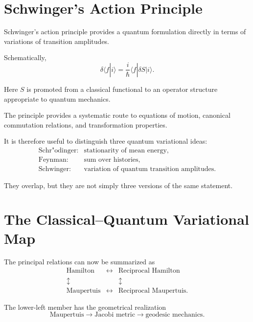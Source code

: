 \section{Schwinger's Action Principle}

Schwinger's action principle provides a quantum formulation directly in terms of variations of transition amplitudes.

Schematically,
\begin{equation}
\boxed{
\delta\langle f|i\rangle
=
\frac{i}{\hbar}
\langle f|\delta S|i\rangle.
}
\end{equation}

Here $S$ is promoted from a classical functional to an operator structure appropriate to quantum mechanics.

The principle provides a systematic route to equations of motion, canonical commutation relations, and transformation properties.

It is therefore useful to distinguish three quantum variational ideas:
\begin{equation}
\boxed{
\begin{array}{ll}
\text{Schr"odinger:}&
\text{stationarity of mean energy},\\
\text{Feynman:}&
\text{sum over histories},\\
\text{Schwinger:}&
\text{variation of quantum transition amplitudes}.
\end{array}}
\end{equation}

They overlap, but they are not simply three versions of the same statement.

\section{The Classical--Quantum Variational Map}

The principal relations can now be summarized as
\begin{equation}
\boxed{
\begin{array}{ccc}
\text{Hamilton}
&\longleftrightarrow&
\text{Reciprocal Hamilton} \\
\updownarrow&&\updownarrow \\
\text{Maupertuis}
&\longleftrightarrow&
\text{Reciprocal Maupertuis}.
\end{array}}
\end{equation}

The lower-left member has the geometrical realization
\begin{equation}
\text{Maupertuis}
\longrightarrow
\text{Jacobi metric}
\longrightarrow
\text{geodesic mechanics}.
\end{equation}

